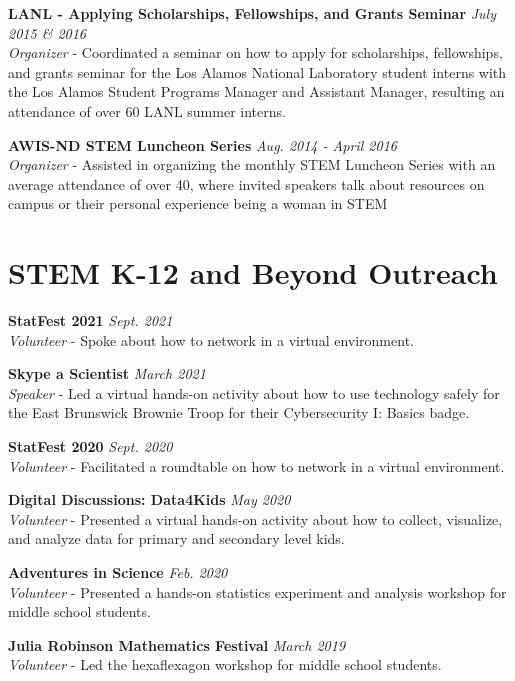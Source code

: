 \documentclass[11pt, letterpaper, roman]{moderncv} %
\newcommand{\outreachspace}{\vspace{5pt}}
\begin{document}
\outreachspace
\textbf{LANL - Applying Scholarships, Fellowships, and Grants Seminar} \hfill \textit{July 2015 \& 2016}\\
\textit{Organizer} - Coordinated a seminar on how to apply for scholarships, fellowships, and grants seminar for the Los Alamos National Laboratory student interns with the Los Alamos Student Programs Manager and Assistant Manager, resulting an attendance of over 60 LANL summer interns.

\outreachspace
\textbf{AWIS-ND STEM Luncheon Series} \hfill \textit{Aug. 2014 - April 2016}\\
\textit{Organizer} - Assisted in organizing the monthly STEM Luncheon Series with an average attendance of over 40, where invited speakers talk about resources on campus or their personal experience being a woman in STEM

\section{STEM K-12 and Beyond Outreach}
\textbf{StatFest 2021} \hfill \textit{Sept. 2021}\\
\textit{Volunteer} - Spoke about how to network in a virtual environment.

\outreachspace
\textbf{Skype a Scientist} \hfill \textit{March 2021}\\
\textit{Speaker} - Led a virtual hands-on activity about how to use technology safely for the East Brunswick Brownie Troop for their Cybersecurity I: Basics badge.

\outreachspace
\textbf{StatFest 2020} \hfill \textit{Sept. 2020}\\
\textit{Volunteer} - Facilitated a roundtable on how to network in a virtual environment.

\outreachspace
\textbf{Digital Discussions: Data4Kids} \hfill \textit{May 2020}\\
\textit{Volunteer} - Presented a virtual hands-on activity about how to collect, visualize, and analyze data for primary and secondary level kids.

\outreachspace
\textbf{Adventures in Science} \hfill \textit{Feb. 2020}\\
\textit{Volunteer} - Presented a hands-on statistics experiment and analysis workshop for middle school students.

\outreachspace
\textbf{Julia Robinson Mathematics Festival} \hfill \textit{March 2019}\\
\textit{Volunteer} - Led the hexaflexagon workshop for middle school students.
\end{document}
